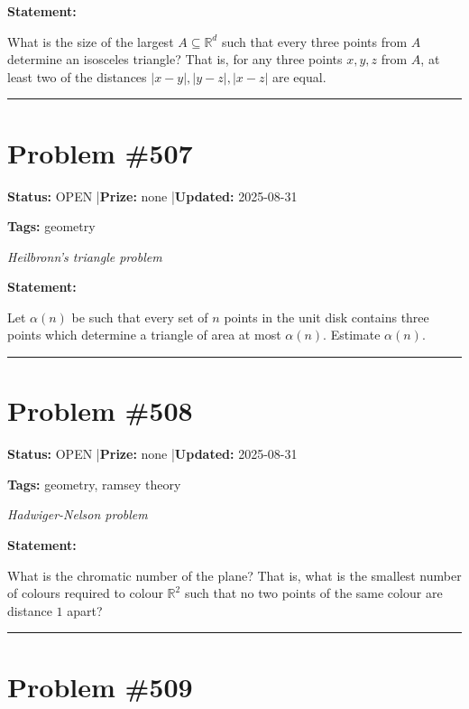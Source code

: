 \documentclass{article}
\begin{document}
\medskip

\noindent\textbf{Statement:}

What is the size of the largest $A\subseteq \mathbb{R}^d$ such that every three points from $A$ determine an isosceles triangle? That is, for any three points $x,y,z$ from $A$, at least two of the distances $\lvert x-y\rvert,\lvert y-z\rvert,\lvert x-z\rvert$ are equal.

\noindent\rule{\linewidth}{0.4pt}


\section{Problem \#507}
\label{prob:507}

\noindent\textbf{Status:} OPEN \quad|\quad \textbf{Prize:} none \quad|\quad \textbf{Updated:} 2025-08-31

\noindent\textbf{Tags:} geometry

\medskip
\noindent\textit{Heilbronn's triangle problem}


\noindent\textbf{Statement:}

Let $\alpha(n)$ be such that every set of $n$ points in the unit disk contains three points which determine a triangle of area at most $\alpha(n)$. Estimate $\alpha(n)$.

\noindent\rule{\linewidth}{0.4pt}


\section{Problem \#508}
\label{prob:508}

\noindent\textbf{Status:} OPEN \quad|\quad \textbf{Prize:} none \quad|\quad \textbf{Updated:} 2025-08-31

\noindent\textbf{Tags:} geometry, ramsey theory

\medskip
\noindent\textit{Hadwiger-Nelson problem}


\noindent\textbf{Statement:}

What is the chromatic number of the plane? That is, what is the smallest number of colours required to colour $\mathbb{R}^2$ such that no two points of the same colour are distance $1$ apart?

\noindent\rule{\linewidth}{0.4pt}


\section{Problem \#509}
\label{prob:509}
\end{document}
